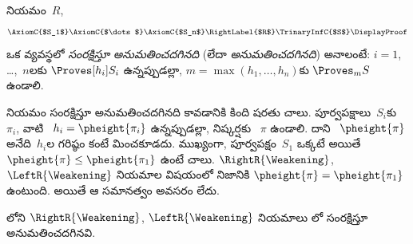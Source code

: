 \documentclass[../../../include/open-logic-section]{subfiles}
\begin{document}
\begin{defn}
నియమం~$R$,
\[
\AxiomC{$S_1$}
\AxiomC{$\dots$}
\AxiomC{$S_n$}
\RightLabel{$R$}
\TrinaryInfC{$S$}
\DisplayProof
\]
ఒక వ్యవస్థలో \emph{ సంరక్షిస్తూ అనుమతించదగినది} (లేదా \emph{ అనుమతించదగినది}) అనాలంటే: $i = 1$, \dots,~$n$లకు $\Proves[h_i] S_i$ ఉన్నప్పుడల్లా, $m = \max(h_1, \dots,
h_n)$కు $\Proves_m S$ ఉండాలి.
\end{defn}

నియమం  సంరక్షిస్తూ అనుమతించదగినది కావడానికి కింది షరతు చాలు. పూర్వపక్షాలు~$S_i$కు ~$\pi_i$, వాటి ~$h_i = \pheight{\pi_i}$ ఉన్నప్పుడల్లా, నిష్కర్షకు ~$\pi$ ఉండాలి. దాని ~$\pheight{\pi}$ అనేది~$h_i$ల గరిష్ఠం కంటే మించకూడదు. ముఖ్యంగా, పూర్వపక్షం~$S_1$ ఒక్కటే అయితే $\pheight{\pi} \le \pheight{\pi_1}$ ఉంటే చాలు. $\RightR{\Weakening}$, $\LeftR{\Weakening}$ నియమాల విషయంలో నిజానికి $\pheight{\pi} = \pheight{\pi_1}$ ఉంటుంది. అయితే ఆ సమానత్వం అవసరం లేదు.

\begin{prop}
లోని $\RightR{\Weakening}$, $\LeftR{\Weakening}$ నియమాలు లో  సంరక్షిస్తూ అనుమతించదగినవి.
\end{prop}
\end{document}
